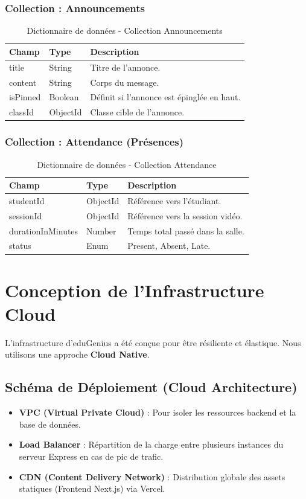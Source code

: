 \subsubsection{Collection : Announcements}
\begin{table}[H]
\centering
\begin{tabular}{|l|l|p{8cm}|}
\hline
\textbf{Champ} & \textbf{Type} & \textbf{Description} \\ \hline
title & String & Titre de l'annonce. \\ \hline
content & String & Corps du message. \\ \hline
isPinned & Boolean & Définit si l'annonce est épinglée en haut. \\ \hline
classId & ObjectId & Classe cible de l'annonce. \\ \hline
\end{tabular}
\caption{Dictionnaire de données - Collection Announcements}
\end{table}

\subsubsection{Collection : Attendance (Présences)}
\begin{table}[H]
\centering
\begin{tabular}{|l|l|p{8cm}|}
\hline
\textbf{Champ} & \textbf{Type} & \textbf{Description} \\ \hline
studentId & ObjectId & Référence vers l'étudiant. \\ \hline
sessionId & ObjectId & Référence vers la session vidéo. \\ \hline
durationInMinutes & Number & Temps total passé dans la salle. \\ \hline
status & Enum & Present, Absent, Late. \\ \hline
\end{tabular}
\caption{Dictionnaire de données - Collection Attendance}
\end{table}
\section{Conception de l'Infrastructure Cloud}
L'infrastructure d'eduGenius a été conçue pour être résiliente et élastique. Nous utilisons une approche \textbf{Cloud Native}.

\subsection{Schéma de Déploiement (Cloud Architecture)}
\begin{itemize}
    \item \textbf{VPC (Virtual Private Cloud)} : Pour isoler les ressources backend et la base de données.
    \item \textbf{Load Balancer} : Répartition de la charge entre plusieurs instances du serveur Express en cas de pic de trafic.
    \item \textbf{CDN (Content Delivery Network)} : Distribution globale des assets statiques (Frontend Next.js) via Vercel.
\end{itemize}

